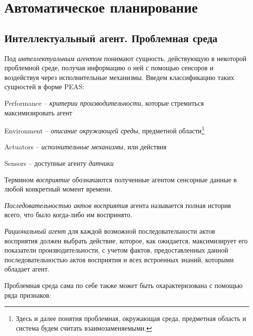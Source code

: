 \chapter{Автоматическое планирование}

\section{Интеллектуальный агент. Проблемная среда}

Под \emph{интеллектуальным агентом} понимают сущность, действующую в некоторой проблемной среде, получая информацию о ней с помощью сенсоров и воздействуя через исполнительные механизмы. Введем классификацию таких сущностей в форме PEAS:

\begin{itemize*}
\item
  Performance -- \emph{критерии производительности}, которые стремиться
  максимизировать агент
\item
  Environment -- \emph{описание окружающей среды}, предметной области\footnote{Здесь и далее понятия проблемная, окружающая среда, предметная область и система будем считать взаимозаменяемыми.}
\item
  Actuators -- \emph{исполнительные механизмы}, или действия
\item
  Sensors -- доступные агенту \emph{датчики}
\end{itemize*}

Термином \emph{восприятие} обозначаются полученные агентом сенсорные
данные в любой конкретный момент времени.

\emph{Последовательностью актов восприятия} агента называется полная
история всего, что было когда-либо им воспринято.

\emph{Рациональный агент} для каждой возможной последовательности актов восприятия
 должен выбрать действие, которое, как ожидается, максимизирует его показатели производительности, с учетом фактов, предоставленных данной последовательностью актов восприятия и всех встроенных знаний, которыми обладает агент.
 
Проблемная среда сама по себе также может быть охарактеризована с помощью ряда признаков:

